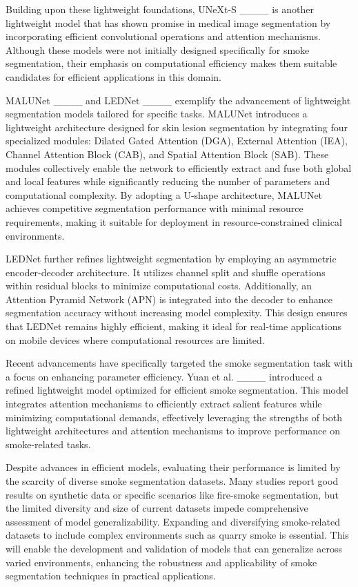 Building upon these lightweight foundations, UNeXt-S ____ is another lightweight model that has shown promise in medical image segmentation by incorporating efficient convolutional operations and attention mechanisms. Although these models were not initially designed specifically for smoke segmentation, their emphasis on computational efficiency makes them suitable candidates for efficient applications in this domain.

MALUNet ____ and LEDNet ____ exemplify the advancement of lightweight segmentation models tailored for specific tasks. MALUNet introduces a lightweight architecture designed for skin lesion segmentation by integrating four specialized modules: Dilated Gated Attention (DGA), External Attention (IEA), Channel Attention Block (CAB), and Spatial Attention Block (SAB). These modules collectively enable the network to efficiently extract and fuse both global and local features while significantly reducing the number of parameters and computational complexity. By adopting a U-shape architecture, MALUNet achieves competitive segmentation performance with minimal resource requirements, making it suitable for deployment in resource-constrained clinical environments.

LEDNet further refines lightweight segmentation by employing an asymmetric encoder-decoder architecture. It utilizes channel split and shuffle operations within residual blocks to minimize computational costs. Additionally, an Attention Pyramid Network (APN) is integrated into the decoder to enhance segmentation accuracy without increasing model complexity. This design ensures that LEDNet remains highly efficient, making it ideal for real-time applications on mobile devices where computational resources are limited.

Recent advancements have specifically targeted the smoke segmentation task with a focus on enhancing parameter efficiency. Yuan et al. ____ introduced a refined lightweight model optimized for efficient smoke segmentation. This model integrates attention mechanisms to efficiently extract salient features while minimizing computational demands, effectively leveraging the strengths of both lightweight architectures and attention mechanisms to improve performance on smoke-related tasks.

Despite advances in efficient models, evaluating their performance is limited by the scarcity of diverse smoke segmentation datasets. Many studies report good results on synthetic data or specific scenarios like fire-smoke segmentation, but the limited diversity and size of current datasets impede comprehensive assessment of model generalizability. Expanding and diversifying smoke-related datasets to include complex environments such as quarry smoke is essential. This will enable the development and validation of models that can generalize across varied environments, enhancing the robustness and applicability of smoke segmentation techniques in practical applications.


